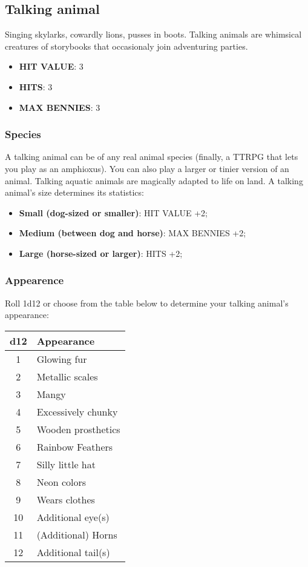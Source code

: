 \newpage
\subsection{Talking animal}
Singing skylarks, cowardly lions, pusses in boots. Talking animals are whimsical creatures of storybooks that occasionaly join adventuring parties.

\begin{multicols}{2}
    \begin{itemize}
      \item \textbf{HIT VALUE}: 3
      \item \textbf{HITS}: 3
      \item \textbf{MAX BENNIES}: 3
    \end{itemize}
    
    \subsubsection*{Species}
    A talking animal can be of any real animal species (finally, a TTRPG that lets you play as an amphioxus). You can also play a larger or tinier version of an animal. Talking aquatic animals are magically adapted to life on land. A talking animal's size determines its statistics:
    \begin{itemize}
        \item {\textbf{Small (dog-sized or smaller)}: HIT VALUE +2;}
        \item {\textbf{Medium (between dog and horse)}: MAX BENNIES +2;}
        \item {\textbf{Large (horse-sized or larger)}: HITS +2;}
    \end{itemize}

    \subsubsection*{Appearence}
    Roll 1d12 or choose from the table below to determine your talking animal's appearance:
    
    \begin{adjustbox}{width=0.55\columnwidth,center}
    \begin{tabular}{|c|l|}
    \hline
    \textbf{d12} & \textbf{Appearance} \\
    \hline
    1 & Glowing fur \\
    2 & Metallic scales \\
    3 & Mangy \\
    4 & Excessively chunky \\
    5 & Wooden prosthetics \\
    6 & Rainbow Feathers \\
    7 & Silly little hat \\
    8 & Neon colors \\
    9 & Wears clothes \\
    10 & Additional eye(s) \\
    11 & (Additional) Horns \\
    12 & Additional tail(s) \\
    \hline
    \end{tabular}
    \end{adjustbox}
    

\end{multicols}
